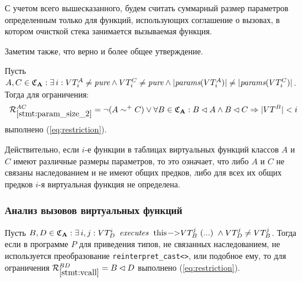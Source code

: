 С учетом всего вышесказанного, будем считать суммарный размер параметров определенным только для функций, использующих соглашение о вызовах, в котором очисткой стека занимается вызываемая функция.

Заметим также, что верно и более общее утверждение.

\begin{statement}\label{stmt:param_size_2}
Пусть $A, C \in \mathfrak{C}_{\mathbf{A}}: \exists \, i: VT^A_i \ne \textit{pure} \wedge VT^C_i \ne \textit{pure} \wedge |\textit{params}(VT^A_i)| \ne |\textit{params}(VT^C_i)|$. Тогда для ограничения:
\begin{equation*}
\mathcal{R}_{\ref{stmt:param_size_2}}^{AC} = \neg (A \sim^+ C) \vee \forall B \in \mathfrak{C}_{\mathbf{A}}: B \lhd A \wedge B \lhd C \Rightarrow |VT^B| < i
\end{equation*}
выполнено (\ref{eq:restriction}).
\end{statement}

Действительно, если $i$-е функции в таблицах виртуальных функций классов $A$ и $C$ имеют различные размеры параметров, то это означает, что либо $A$ и $C$ не связаны наследованием и не имеют общих предков, либо для всех их общих предков $i$-я виртуальная функция не определена.
\fi



\subsubsection{Анализ вызовов виртуальных функций}\label{chapter:vcalls}
\begin{statement}\label{stmt:vcall}
Пусть $B, D \in \gCa: \exists \, i, j: VT_D^i \enspace \executes \enspace \text{\lstinline{this->}}VT_B^j\text{\lstinline{(...)}} \wedge VT_D^j \ne VT_B^j$. Тогда если в программе $P$ для приведения типов, не связанных наследованием, не используется преобразование \lstinline{reinterpret_cast<>}, или подобное ему, то для ограничения $\mathcal{R}_{\ref{stmt:vcall}}^{BD} = B \lhd D$ выполнено (\ref{eq:restriction}).
\end{statement}

